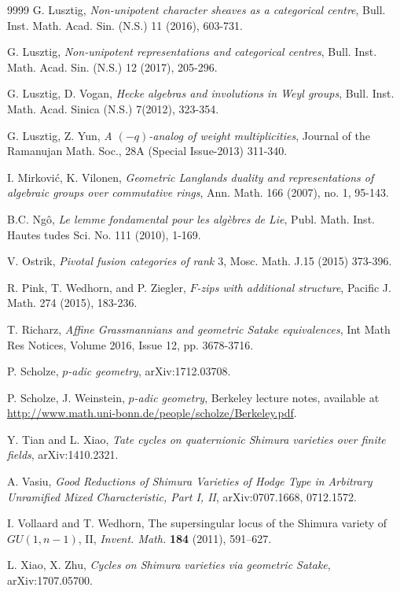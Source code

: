 \begin{thebibliography}{9999}
G. Lusztig, \emph{Non-unipotent character sheaves as a categorical centre}, Bull. Inst. Math. Acad. Sin. (N.S.) 11 (2016), 603-731.

G. Lusztig, \emph{Non-unipotent representations and categorical centres}, Bull. Inst. Math. Acad. Sin. (N.S.) 12 (2017), 205-296.

G. Lusztig, D. Vogan, \emph{Hecke algebras and involutions in Weyl groups}, Bull. Inst. Math. Acad. Sinica (N.S.) 7(2012), 323-354.

G. Lusztig, Z. Yun, \emph{A $(-q)$-analog of weight multiplicities}, Journal of the Ramanujan Math. Soc., 28A (Special Issue-2013) 311-340.

I. Mirkovi\'c, K. Vilonen,
\emph{Geometric Langlands duality and representations of algebraic groups over commutative rings},
Ann. Math. 166 (2007), no. 1, 95-143.

B.C. Ng\^o, \emph{Le lemme fondamental pour les alg\`ebres de Lie}, Publ. Math. Inst. Hautes tudes Sci. No. 111 (2010), 1-169.

V. Ostrik, \emph{Pivotal fusion categories of rank $3$}, Mosc. Math. J.15 (2015) 373-396.

R. Pink, T. Wedhorn, and P. Ziegler, \emph{$F$-zips with additional structure}, Pacific J. Math. 274 (2015), 183-236.

T. Richarz, \emph{Affine Grassmannians and geometric Satake equivalences}, Int Math Res Notices, Volume 2016, Issue 12, pp. 3678-3716.

P. Scholze, \emph{$p$-adic geometry}, arXiv:1712.03708.

P. Scholze, J. Weinstein, \emph{$p$-adic geometry}, Berkeley lecture notes,
available at \url{http://www.math.uni-bonn.de/people/scholze/Berkeley.pdf}.

Y. Tian and L. Xiao, \emph{Tate cycles on quaternionic Shimura varieties over finite fields}, arXiv:1410.2321.

A. Vasiu, \emph{Good Reductions of Shimura Varieties of Hodge Type in Arbitrary Unramified Mixed Characteristic, Part I, II}, arXiv:0707.1668, 0712.1572.

I. Vollaard and T. Wedhorn,
The supersingular locus of the Shimura variety of $GU(1,n-1)$, II, \emph{
Invent. Math.} \textbf{184} (2011), 591--627.

L. Xiao, X. Zhu, \emph{Cycles on Shimura varieties via geometric Satake}, arXiv:1707.05700.


\end{thebibliography}
